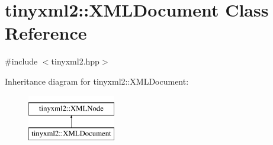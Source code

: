 \hypertarget{classtinyxml2_1_1_x_m_l_document}{\section{tinyxml2\-:\-:X\-M\-L\-Document Class Reference}
\label{classtinyxml2_1_1_x_m_l_document}
}


{\ttfamily \#include $<$tinyxml2.\-hpp$>$}

Inheritance diagram for tinyxml2\-:\-:X\-M\-L\-Document\-:\begin{figure}[H]
\begin{center}
\leavevmode
\includegraphics[height=2.000000cm]{classtinyxml2_1_1_x_m_l_document}
\end{center}
\end{figure}
